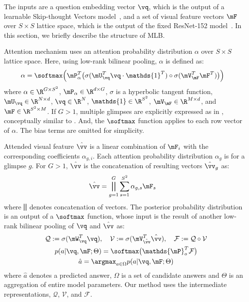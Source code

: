 \documentclass{article}
\begin{document}
The inputs are a question embedding vector $\vq$, which is the output of a learnable Skip-thought Vectors model~\cite{Kiros2015}, and a set of visual feature vectors $\mF$ over $S \times S$ lattice space, which is the output of the fixed ResNet-152 model~\cite{He2015}. In this section, we briefly describe the structure of MLB.

Attention mechanism uses an attention probability distribution $\alpha$ over $S \times S$ lattice space. Here, using low-rank bilinear pooling, $\alpha$ is defined as:  \begin{align}
   \alpha &= \softmax \Big(\mP_\alpha^T \big( \sigma(\mU^T_{\vq} \vq \cdot \mathds{1}^T) \circ \sigma(\mV^T_{\mF} \mF^T) \big) \Big) \label{eq:alpha}
\end{align}
where $\alpha \in \R^{G \times S^2}$, $\mP_\alpha \in \R^{d \times G}$, $\sigma$ is a hyperbolic tangent function, $\mU_\vq \in \R^{N \times d}$, $\vq \in \R^N$, $\mathds{1} \in \R^{S^2}$, $\mV_\mF \in \R^{M \times d}$, and $\mF \in \R^{S^2 \times M}$. If $G > 1$, multiple glimpses are explicitly expressed as in \citet{Fukui2016}, conceptually similar to \citet{Jaderberg2015}. And, the $\softmax$ function applies to each row vector of $\alpha$. The bias terms are omitted for simplicity. %

Attended visual feature $\hat{\vv}$ is a linear combination of $\mF_i$ with the corresponding coefficients $\alpha_{g,i}$. Each attention probability distribution $\alpha_{g}$ is for a glimpse $g$. For $G > 1$, $\hat{\vv}$ is the concatenation of resulting vectors $\hat{\vv}_g$ as: \begin{align} 
  \hat{\vv} &= \bigparallel_{g=1}^G \sum_{s=1}^{S^2} \alpha_{g,s} \mF_{s} \label{eq:concat}
\end{align}
where $\bigparallel$ denotes concatenation of vectors. The posterior probability distribution is an output of a $\softmax$ function, whose input is the result of another low-rank bilinear pooling of $\vq$ and $\hat{\vv}$ as: \begin{gather}
   \mathcal{Q} := \sigma(\mW_\vq^T\vq), \hspace{1em}
   \mathcal{V} := \sigma(\mV_{\hat{\vv}}^T\hat{\vv}), \hspace{1em} 
   \mathcal{F} := \mathcal{Q} \circ \mathcal{V} \\
   p(a|\vq,\mF;\Theta) = \softmax \big( \mathds{\mP}_o^T \mathcal{F} \big) \\
  \hat{a} = \argmax_{a \in \Omega} p(a|\vq,\mF;\Theta)
\end{gather}
where $\hat{a}$ denotes a predicted answer, $\Omega$ is a set of candidate answers and $\Theta$ is an aggregation of entire model parameters.
Our method uses the intermediate representations, $\mathcal{Q}$, $\mathcal{V}$, and $\mathcal{F}$.
\end{document}
